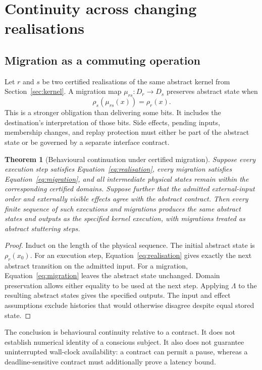 \documentclass[11pt,a4paper]{article}
\newtheorem{theorem}{Theorem}[section]
\theoremstyle{definition}
\theoremstyle{remark}
\begin{document}
\section{Continuity across changing realisations}\label{sec:continuity}
\subsection{Migration as a commuting operation}
Let $r$ and $s$ be two certified realisations of the same abstract kernel from Section~\ref{sec:kernel}. A migration map $\mu_{rs}:D_r\to D_s$ preserves abstract state when
\begin{equation}\label{eq:migration}
 \rho_s(\mu_{rs}(x))=\rho_r(x).
\end{equation}
This is a stronger obligation than delivering some bits. It includes the destination's interpretation of those bits. Side effects, pending inputs, membership changes, and replay protection must either be part of the abstract state or be governed by a separate interface contract.

\begin{theorem}[Behavioural continuation under certified migration]\label{thm:continuation}
Suppose every execution step satisfies Equation~\eqref{eq:realisation}, every migration satisfies Equation~\eqref{eq:migration}, and all intermediate physical states remain within the corresponding certified domains. Suppose further that the admitted external-input order and externally visible effects agree with the abstract contract. Then every finite sequence of such executions and migrations produces the same abstract states and outputs as the specified kernel execution, with migrations treated as abstract stuttering steps.
\end{theorem}
\begin{proof}
Induct on the length of the physical sequence. The initial abstract state is $\rho_r(x_0)$. For an execution step, Equation~\eqref{eq:realisation} gives exactly the next abstract transition on the admitted input. For a migration, Equation~\eqref{eq:migration} leaves the abstract state unchanged. Domain preservation allows either equality to be used at the next step. Applying $\Lambda$ to the resulting abstract states gives the specified outputs. The input and effect assumptions exclude histories that would otherwise disagree despite equal stored state.
\end{proof}
The conclusion is behavioural continuity relative to a contract. It does not establish numerical identity of a conscious subject. It also does not guarantee uninterrupted wall-clock availability: a contract can permit a pause, whereas a deadline-sensitive contract must additionally prove a latency bound.
\end{document}
